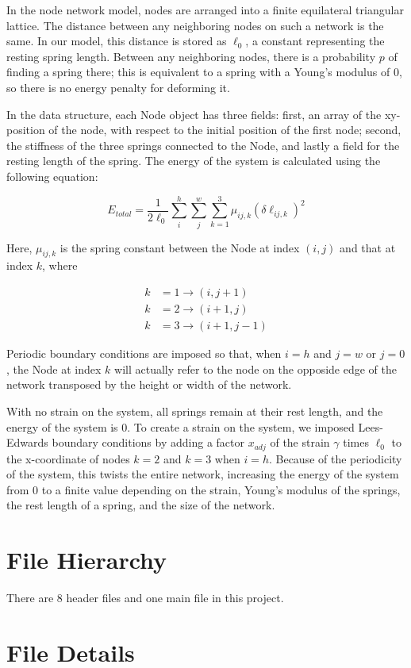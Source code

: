 \documentclass{article}
\begin{document}
\begin{multicols}{2}
    In the node network model, nodes are arranged into a finite equilateral triangular lattice. The distance between any neighboring nodes on such a
    network is the same. In our model, this distance is stored as $ \ell_{0} $, a constant representing the resting spring length. Between any
    neighboring nodes, there is a probability $ p $ of finding a spring there; this is equivalent to a spring with a Young's modulus of $ 0 $, so
    there is no energy penalty for deforming it.
    
    In the data structure, each Node object has three fields: first, an array of the xy-position of the node, with respect to the initial position of
    the first node; second, the stiffness of the three springs connected to the Node, and lastly a field for the resting length of the spring. The
    energy of the system is calculated using the following equation:

    \begin{equation}
        E_{total} = \frac{1}{2\ell_{0}} \sum\limits_{i}^{h} \sum\limits_{j}^w \sum\limits_{k=1}^3 \mu_{ij,k}( \delta \ell_{ij,k} )^2
        \label{eqn:energy}
    \end{equation}
    
    Here, $ \mu_{ij,k} $ is the spring constant between the Node at index $ ( i,j ) $ and that at index $ k $, where

    \begin{align*}
        k & = 1 \to ( i, j+1 ) \\
        k & = 2 \to ( i+1, j ) \\
        k & = 3 \to ( i+1, j-1 )
    \end{align*}
    
    Periodic boundary conditions are imposed so that, when $ i = h $ and $ j = w $ or $ j = 0 $, the Node at index $ k $ will actually refer to the
    node on the opposide edge of the network transposed by the height or width of the network.
    
    With no strain on the system, all springs remain at their rest length, and the energy of the system is 0. To create a strain on the system, we
    imposed Lees-Edwards boundary conditions by adding a factor $ x_{adj} $ of the strain $ \gamma $ times $ \ell_{0} $ to the x-coordinate of nodes $
    k = 2 $ and $ k = 3 $ when $ i = h $. Because of the periodicity of the system, this twists the entire network, increasing the energy of the
    system from 0 to a finite value depending on the strain, Young's modulus of the springs, the rest length of a spring, and the size of the network.

    \section{File Hierarchy}
    
    There are 8 header files and one main file in this project.

    \section{File Details}
    


\end{multicols}
\end{document}

